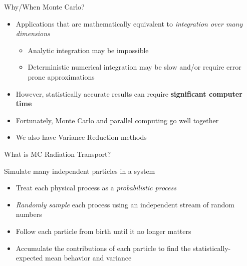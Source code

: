 \documentclass[xcolor=x11names,compress,handout]{beamer}
\renewcommand{\(}{\begin{columns}}
\renewcommand{\)}{\end{columns}}
\newcommand{\<}[1]{\begin{column}{#1}}
\renewcommand{\>}{\end{column}}
\begin{document}
\begin{frame}{Why/When Monte Carlo?}

\begin{itemize}
\item Applications that are mathematically equivalent to \textit{integration over many dimensions}
\vspace*{0.25 em}
\begin{itemize}
\item Analytic integration may be impossible
\vspace*{0.25 em}
\item Deterministic numerical integration may be slow and/or require error prone approximations
\end{itemize} 
\vspace*{0.5 em}

\item However, statistically accurate results can require \textbf{significant computer time}
\item Fortunately, Monte Carlo and parallel computing go well together
\item We also have Variance Reduction methods
\end{itemize}

\end{frame}


\begin{frame}{What is MC Radiation Transport?}

Simulate many independent particles in a system
\begin{itemize}
\item Treat each physical process as a
\textit{probabilistic process}

\item \textit{Randomly sample} each process using an
independent stream of random numbers

\item Follow each particle from birth until it no
longer matters

\item Accumulate the contributions of each
particle to find the statistically-expected
mean behavior and variance
\end{itemize}

\end{frame}
\end{document}
